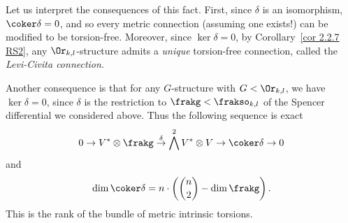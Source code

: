 \begin{example}
    Let us interpret the consequences of this fact. First, since $\delta$ is an isomorphism, $\coker\delta=0$, and so every metric connection (assuming one exists!) can be modified to be torsion-free. Moreover, since $\ker\delta=0$, by Corollary~\ref{cor 2.2.7 RS2}, any $\Or_{k,l}$-structure admits a \emph{unique} torsion-free connection, called the \emph{Levi-Civita connection}. 

    Another consequence is that for any $G$-structure with $G<\Or_{k,l}$, we have $\ker\delta=0$, since $\delta$ is the restriction to $\frakg<\frakso_{k,l}$ of the Spencer differential we considered above. Thus the following  sequence is exact 
    \[0\to V^\ast\otimes \frakg\overset{\delta}{\to}\bigwedge^2 V^\ast\otimes V\to \coker\delta\to 0\]
    and 
    \[\dim\coker\delta =n\cdot \left(\binom{n}{2}-\dim\frakg\right).\]
    This is the rank of the bundle of metric intrinsic torsions.
\end{example}


